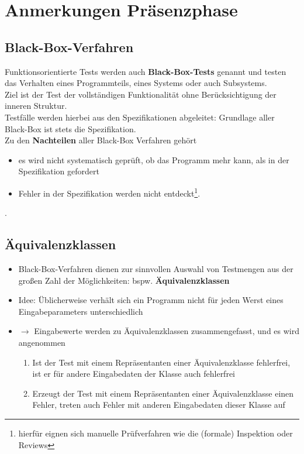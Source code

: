 \chapter{Anmerkungen Präsenzphase}

\section{Black-Box-Verfahren}

Funktionsorientierte Tests werden auch \textbf{Black-Box-Tests} genannt und testen das Verhalten eines Programmteils, eines Systems oder auch Subsystems.\\
Ziel ist der Test der vollständigen Funktionalität ohne Berücksichtigung der inneren Struktur.\\
Testfälle werden hierbei aus den Spezifikationen abgeleitet: Grundlage aller Black-Box ist stets die Spezifikation.\\

\noindent
Zu den \textbf{Nachteilen} aller Black-Box Verfahren gehört
\begin{itemize}
    \item es wird nicht systematisch geprüft, ob das Programm mehr kann, als in der Spezifikation gefordert
    \item Fehler in der Spezifikation werden nicht entdeckt\footnote{
    hierfür eignen sich manuelle Prüfverfahren wie die (formale) Inspektion oder Reviews
    }.
\end{itemize}.

\section{Äquivalenzklassen}

\begin{itemize}
    \item Black-Box-Verfahren dienen zur sinnvollen Auswahl von Testmengen aus der großen Zahl der Möglichkeiten: bspw. \textbf{Äquivalenzklassen}
    \item Idee: Üblicherweise verhält sich ein Programm nicht für jeden Werst eines Eingabeparameters unterschiedlich
    \item[] $\rightarrow$ Eingabewerte werden zu Äquivalenzklassen zusammengefasst, und es wird angenommen
    \begin{enumerate}
        \item Ist der Test mit einem Repräsentanten einer Äquivalenzklasse fehlerfrei, ist er für andere Eingabedaten der Klasse auch fehlerfrei
        \item Erzeugt der Test mit einem Repräsentanten einer Äquivalenzklasse einen Fehler, treten auch Fehler mit anderen Eingabedaten dieser Klasse auf
    \end{enumerate}
\end{itemize}

